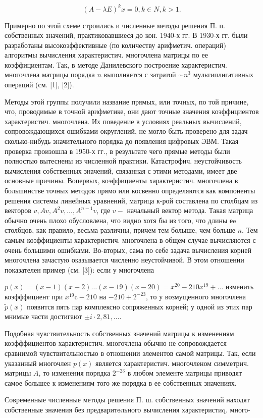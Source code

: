 \documentclass[10pt]{article}
\begin{document}
\[

(A-\lambda E)^{k} x=0, k \in N, k>1 .

\]



Примерно по этой схеме строились и численные методы решения П. п. собственных значений, практиковавшиеся до кон. 1940-х гг. В 1930-х гг. были разработаны высокоэффективные (по количеству арифметич. операций) алгоритмы вычисления характеристич. многочлена матрицы по ее коэффициентам. Так, в методе Данилевского построение характеристич. многочлена матрицы порядка $n$ выполняется с затратой $\sim n^{3}$ мультиплигативных операций (см. [1], [2]).



Методы этой группы получили название прямых, или точных, по той причине, что, проводимые в точной арифметике, они дают точные значения коэффициентов характеристич. многочлена. Их поведение в условиях реальных вычислений, сопровождающихся ошибками округлений, не могло быть проверено для задач сколько-нибудь значительного порядка до появления цифровых ЭВМ. Такая проверка произошла в 1950-х гг., в результате чего прямые методы были полностью вытеснены из численной практики. Катастрофич. неустойчивость вычисления собственных значений, связанная с этими методами, имеет две основные причины. Вопервых, коэффициенты характеристич. многочлена в большинстве точных методов прямо или косвенно определяются как компоненты решения системы линейных уравнений, матрица к-рой составлена по столбцам из векторов $v, A v, A^{2} v, \ldots, A^{n-1} v$, где $v-$ начальный вектор метода. Такая матрица обычно очень плохо обусловлена, что видно хотя бы из того, что длины еe столбцов, как правило, весьма различны, причем тем болыше, чем больше $n$. Тем самым коэффициенты характеристич. многочлена в общем случае вычисляются с очень большими ошибками. Во-вторых, сама по себе задача вычисления корней многочлена зачастую оказывается численно неустойчивой. В этом отношении показателен пример (см. [3]): если у многочлена



$p(x)=(x-1)(x-2) \ldots(x-19)(x-20)=x^{20}-210 x^{19}+\ldots$ изменить коэфффициент при $x^{19} \mathrm{c}-210$ на $-210+2^{-23}$, то у возмущенного многочлена $\tilde{p}(x)$ появится пять пар комплексно сопряженных корней; у одной из этих пар мнимые части достигают $\pm i \cdot 2,81, \ldots$.



Подобная чувствительность собственных значений матрицы к изменениям коэфффициентов характеристич. многочлена обычно не сопровождается сравнимой чувствительностью в отношении элементов самой матрицы. Так, если указанный многочлен $p(x)$ является характеристич. многочленом симметрич. матрицы $A$, то изменения порядка $2^{-23}$ в любом элементе матрицы приводят самое большее к изменениям того же порядка в ее собственных значениях.



Современные численные методы решения П. ш. собственных значений находят собственные значения без предваритөльного вычисления характеристиq. много-
\end{document}
